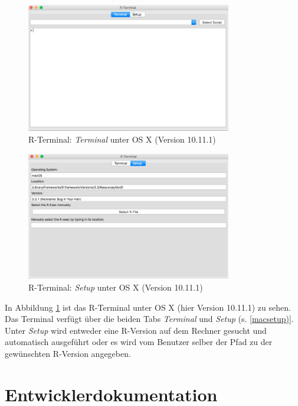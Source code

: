 \documentclass[a4paper, 12pt]{report} %
\begin{document}
\begin{figure}[htpb]
\centering
\includegraphics[width=0.8\textwidth]{R-Terminal}
\caption{R-Terminal: \textit{Terminal} unter OS X (Version 10.11.1)}
\label{rterminalmac}
\end{figure}

\begin{figure}[htpb]
\centering
\includegraphics[width=0.8\textwidth]{rterminalsetup}
\caption{R-Terminal: \textit{Setup} unter OS X (Version 10.11.1)}
\label{macsetup}
\end{figure}

In Abbildung \ref{rterminalmac} ist das R-Terminal unter OS X (hier Version 10.11.1) zu sehen. Das Terminal verfügt über die beiden Tabs \textit{Terminal} und \textit{Setup} (s. \ref{macsetup)}. Unter \textit{Setup} wird entweder eine R-Version auf dem Rechner gesucht und automatisch ausgeführt oder es wird vom Benutzer selber der Pfad zu der gewünschten R-Version angegeben.

\newpage

\chapter{Entwicklerdokumentation}
\end{document}
